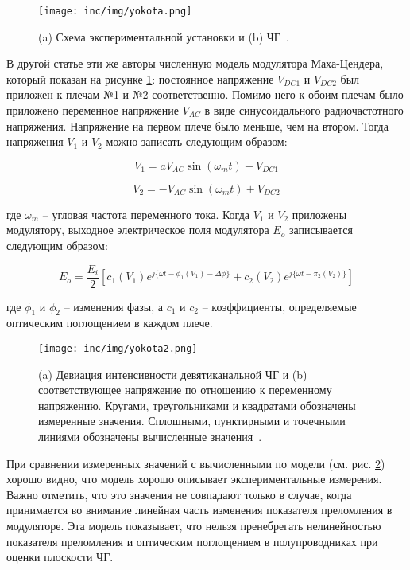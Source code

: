 \begin{figure}[ht]
  \centering
  \texttt{[image: inc/img/yokota.png]}
  \caption{(a) Схема экспериментальной установки и (b) ЧГ~\cite{Yokota2015}.}
  \label{fig:yokota}
\end{figure}

В другой статье \cite{Yokota_2015} эти же авторы численную модель модулятора Маха-Цендера, который показан на рисунке \ref{fig:yokota}: постоянное напряжение $V_{DC1}$ и $V_{DC2}$ был приложен к плечам №1 и №2 соответственно. Помимо него к обоим плечам было приложено переменное напряжение $V_{AC}$ в виде синусоидального радиочастотного напряжения. Напряжение на первом плече было меньше, чем на втором. Тогда напряжения $V_1$ и $V_2$ можно записать следующим образом:

\begin{equation}
  V_1 = aV_{AC}\sin(\omega_m t) + V_{DC1}
\end{equation}

\begin{equation}
  V_2 = -V_{AC}\sin(\omega_m t) + V_{DC2}
\end{equation}

где $\omega_m$ \--- угловая частота переменного тока. Когда $V_1$ и $V_2$ приложены модулятору, выходное электрическое поля модулятора $E_o$ записывается следующим образом:

\begin{equation}
  E_o = \frac{E_i}{2} \left[ c_1(V_1)e^{j\{\omega t - \phi_1(V_1) - \Delta \phi\}} + c_2(V_2) e^{j\{\omega t-\pi_2(V_2)\}} \right]
\end{equation}

где $\phi_1$ и $\phi_2$ \--- изменения фазы, а $c_1$ и $c_2$ \--- коэффициенты, определяемые оптическим поглощением в каждом плече. 

\begin{figure}[ht]
  \centering
  \texttt{[image: inc/img/yokota2.png]}
  \caption{(a) Девиация интенсивности девятиканальной ЧГ и (b) соответствующее напряжение по отношению к переменному напряжению. Кругами, треугольниками и квадратами обозначены измеренные значения. Сплошными, пунктирными и точечными линиями обозначены вычисленные значения~\cite{Yokota_2015}.}
  \label{fig:yokota2}
\end{figure}

При сравнении измеренных значений с вычисленными по модели (см. рис. \ref{fig:yokota2}) хорошо видно, что модель хорошо описывает экспериментальные измерения. Важно отметить, что это значения не совпадают только в случае, когда принимается во внимание линейная часть изменения показателя преломления в модуляторе. Эта модель показывает, что нельзя пренебрегать нелинейностью показателя преломления и оптическим поглощением в полупроводниках при оценки плоскости ЧГ.

